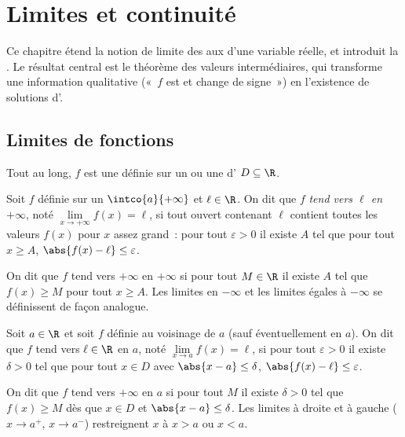 \chapter{Limites et continuité}\label{ch:g12:limcont}

Ce chapitre étend la notion de limite des  aux  d'une
variable réelle, et introduit la . Le résultat central est le
théorème des valeurs intermédiaires, qui transforme une information
qualitative («~$f$ est  et change de signe~») en l'existence de
solutions d'.

\section{Limites de fonctions}

Tout au long, $f$ est une  définie sur un  ou une 
d' $D \subseteq \R$.

\begin{definition}\label{def:g12:limcont:liminf}
Soit $f$ définie sur un  $\intco{a}{+\infty}$ et $\ell \in \R$.
On dit que $f$ \emph{tend vers $\ell$ en $+\infty$}, noté $\lim\limits_{x\to+\infty} f(x) = \ell$, si tout
 ouvert contenant $\ell$ contient toutes les valeurs $f(x)$ pour
$x$ assez grand~: pour tout $\varepsilon > 0$ il existe $A$ tel que pour
tout $x \geq A$, $\abs{f(x) - \ell} \leq \varepsilon$.

On dit que $f$ tend vers $+\infty$ en $+\infty$ si pour tout $M \in \R$ il
existe $A$ tel que $f(x) \geq M$ pour tout $x \geq A$. Les limites en
$-\infty$ et les limites égales à $-\infty$ se définissent de façon
analogue.
\end{definition}

\begin{definition}\label{def:g12:limcont:limpoint}
Soit $a \in \R$ et soit $f$ définie au voisinage de $a$ (sauf éventuellement
en $a$). On dit que $f$ tend vers $\ell \in \R$ en $a$, noté
$\lim\limits_{x \to a} f(x) = \ell$, si pour tout $\varepsilon > 0$ il
existe $\delta > 0$ tel que pour tout $x \in D$ avec
$\abs{x - a} \leq \delta$, $\abs{f(x) - \ell} \leq \varepsilon$.

On dit que $f$ tend vers $+\infty$ en $a$ si pour tout $M$ il existe
$\delta > 0$ tel que $f(x) \geq M$ dès que $x \in D$ et
$\abs{x - a} \leq \delta$. Les limites à droite et à gauche
($x \to a^+$, $x \to a^-$) restreignent $x$ à $x > a$ ou $x < a$.
\end{definition}

